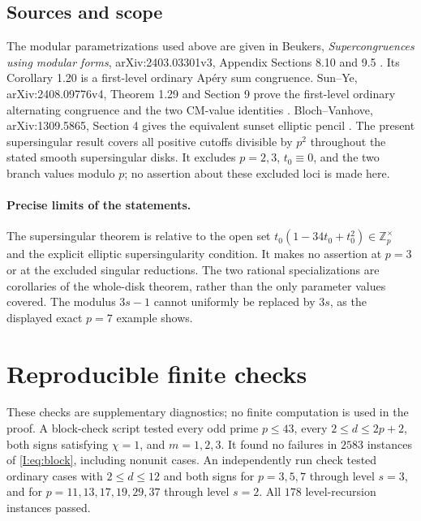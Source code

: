 \documentclass[11pt,letterpaper]{article}
\theoremstyle{definition}
\theoremstyle{remark}
\newcommand{\paperanchors}[1]{%
 \renewcommand{\theHsection}{#1.\arabic{section}}%
 \renewcommand{\theHsubsection}{\theHsection.\arabic{subsection}}%
 \renewcommand{\theHequation}{#1.\arabic{equation}}%
 \renewcommand{\theHtable}{#1.\arabic{table}}%
 \renewcommand{\theHtheorem}{\theHsection.\arabic{theorem}}}
\begin{document}
\subsection{Sources and scope}

The modular parametrizations used above are given in Beukers,
\emph{Supercongruences using modular forms}, arXiv:2403.03301v3,
Appendix Sections 8.10 and 9.5 \cite{III:Beukers2026}. Its Corollary 1.20 is a first-level
ordinary Ap\'ery sum congruence. Sun--Ye, arXiv:2408.09776v4, Theorem 1.29
and Section 9 prove the first-level ordinary alternating congruence
and the two CM-value identities \cite{I:SunYe}. Bloch--Vanhove, arXiv:1309.5865,
Section 4 gives the equivalent sunset elliptic pencil \cite{I:BlochVanhove}.
The present supersingular result covers all positive cutoffs divisible
by $p^2$ throughout the stated smooth supersingular disks. It excludes
$p=2,3$, $t_0\equiv0$, and the two branch values modulo $p$; no assertion
about these excluded loci is made here.


\paragraph{Precise limits of the statements.}
The supersingular theorem is relative to the open set
$t_0(1-34t_0+t_0^2)\in\mathbb Z_p^\times$ and the explicit elliptic
supersingularity condition. It makes no assertion at $p=3$ or at the
excluded singular reductions. The two rational specializations are
corollaries of the whole-disk theorem, rather than the only parameter
values covered. The modulus $3s-1$ cannot uniformly be replaced by
$3s$, as the displayed exact $p=7$ example shows.

\appendix\paperanchors{I.app}

\section{Reproducible finite checks}

These checks are supplementary diagnostics; no finite computation is
used in the proof.  A block-check script tested every odd prime
$p\le43$, every $2\le d\le2p+2$, both signs satisfying $\chi=1$, and
$m=1,2,3$.  It found no failures in $2583$ instances of
\eqref{I:eq:block}, including nonunit cases.
An independently run check tested ordinary cases with
$2\le d\le12$ and both signs for $p=3,5,7$ through level $s=3$, and
for $p=11,13,17,19,29,37$ through level $s=2$.
All $178$ level-recursion instances passed.
\end{document}
